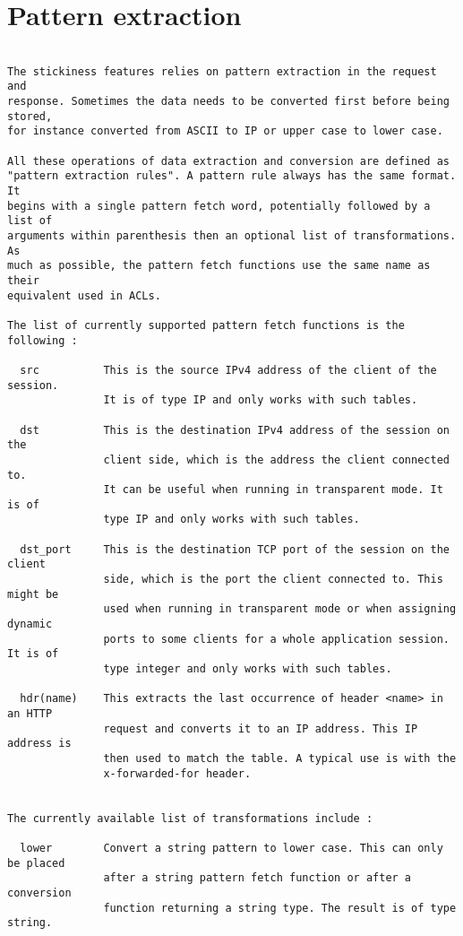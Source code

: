 
\section{Pattern extraction}

\begin{verbatim}

The stickiness features relies on pattern extraction in the request and
response. Sometimes the data needs to be converted first before being stored,
for instance converted from ASCII to IP or upper case to lower case.

All these operations of data extraction and conversion are defined as
"pattern extraction rules". A pattern rule always has the same format. It
begins with a single pattern fetch word, potentially followed by a list of
arguments within parenthesis then an optional list of transformations. As
much as possible, the pattern fetch functions use the same name as their
equivalent used in ACLs.

The list of currently supported pattern fetch functions is the following :

  src          This is the source IPv4 address of the client of the session.
               It is of type IP and only works with such tables.

  dst          This is the destination IPv4 address of the session on the
               client side, which is the address the client connected to.
               It can be useful when running in transparent mode. It is of
               type IP and only works with such tables.

  dst_port     This is the destination TCP port of the session on the client
               side, which is the port the client connected to. This might be
               used when running in transparent mode or when assigning dynamic
               ports to some clients for a whole application session. It is of
               type integer and only works with such tables.

  hdr(name)    This extracts the last occurrence of header <name> in an HTTP
               request and converts it to an IP address. This IP address is
               then used to match the table. A typical use is with the
               x-forwarded-for header.


The currently available list of transformations include :

  lower        Convert a string pattern to lower case. This can only be placed
               after a string pattern fetch function or after a conversion
               function returning a string type. The result is of type string.


\end{verbatim}
